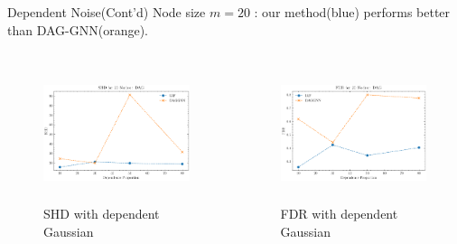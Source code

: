 \documentclass{beamer}
\begin{document}
\begin{frame}{Dependent Noise(Cont'd)}
    Node size $m=20$ : our method(blue) performs better than DAG-GNN(orange).
    \begin{columns}
        \begin{column}{0.5\textwidth}
            \begin{figure}
                \centering
                \includegraphics[height=4cm]{fig/SHD_dependence_20_DAG_threshold0.3.pdf}
                \caption{SHD with dependent Gaussian}
                \label{fig:dep_gaussian_shd_20}
            \end{figure}
        \end{column}
        \begin{column}{0.5\textwidth}
            \begin{figure}
                \centering
                \includegraphics[height=4cm]{fig/FDR_dependence_20_DAG_threshold0.3.pdf}
                \caption{FDR with dependent Gaussian}
                \label{fig:dep_gaussian_fdr_20}
            \end{figure}
        \end{column}
    \end{columns}
\end{frame}
\end{document}
